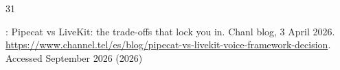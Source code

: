 \documentclass[11pt]{article}
\begin{document}
\begin{thebibliography}{31}
\begin{botherref}
:
{Pipecat} vs {LiveKit}: the trade-offs that lock you in.
Chanl blog, 3 April 2026.
  \url{https://www.channel.tel/es/blog/pipecat-vs-livekit-voice-framework-decision}.
Accessed September 2026
(2026)
\end{botherref}
\endbibitem

\end{thebibliography}
\end{document}
